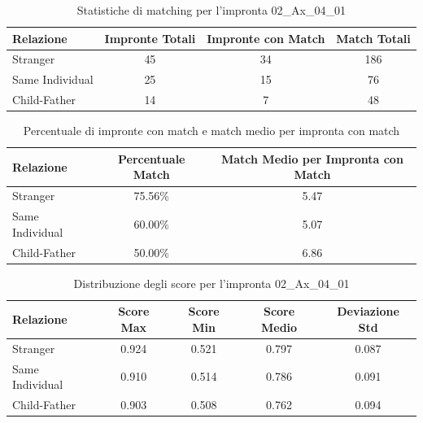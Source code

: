 \begin{table}[htbp]
\centering
\caption{Statistiche di matching per l'impronta 02\_Ax\_04\_01}
\label{tab:results_02_Ax_04_01}
\begin{tabular}{|l|c|c|c|}
\hline
\textbf{Relazione} & \textbf{Impronte Totali} & \textbf{Impronte con Match} & \textbf{Match Totali} \\
\hline
Stranger & 45 & 34 & 186 \\
\hline
Same Individual & 25 & 15 & 76 \\
\hline
Child-Father & 14 & 7 & 48 \\
\hline
\end{tabular}
\end{table}


\begin{table}[htbp]
\centering
\caption{Percentuale di impronte con match e match medio per impronta con match}
\label{tab:match_percentage_02_Ax_04_01}
\begin{tabular}{|l|c|c|}
\hline
\textbf{Relazione} & \textbf{Percentuale Match} & \textbf{Match Medio per Impronta con Match} \\
\hline
Stranger & 75.56\% & 5.47 \\
\hline
Same Individual & 60.00\% & 5.07 \\
\hline
Child-Father & 50.00\% & 6.86 \\
\hline
\end{tabular}
\end{table}


\begin{table}[htbp]
\centering
\caption{Distribuzione degli score per l'impronta 02\_Ax\_04\_01}
\label{tab:scores_02_Ax_04_01}
\begin{tabular}{|l|c|c|c|c|}
\hline
\textbf{Relazione} & \textbf{Score Max} & \textbf{Score Min} & \textbf{Score Medio} & \textbf{Deviazione Std} \\
\hline
Stranger & 0.924 & 0.521 & 0.797 & 0.087 \\
\hline
Same Individual & 0.910 & 0.514 & 0.786 & 0.091 \\
\hline
Child-Father & 0.903 & 0.508 & 0.762 & 0.094 \\
\hline
\end{tabular}
\end{table}

